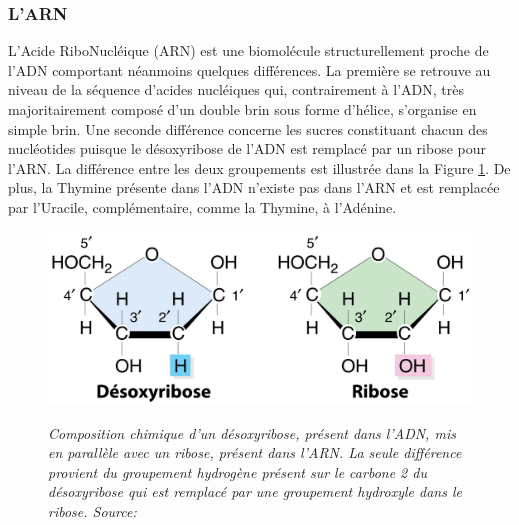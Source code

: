 \subsubsection{L'ARN}

L'Acide RiboNucléique (ARN) est une biomolécule structurellement proche de l'ADN comportant néanmoins quelques différences. La première se retrouve au niveau de la séquence d'acides nucléiques qui, contrairement à l'ADN, très majoritairement composé d'un double brin sous forme d'hélice, s'organise en simple brin. Une seconde différence concerne les sucres constituant chacun des nucléotides puisque le désoxyribose de l'ADN est remplacé par un ribose pour l'ARN. La différence entre les deux groupements est illustrée dans la Figure \ref{Fig:desoxyribose_vs_ribose}. De plus, la Thymine présente dans l'ADN n'existe pas dans l'ARN et est remplacée par l'Uracile, complémentaire, comme la Thymine, à l'Adénine.

\begin{figure}[htb]
  \centering
  {\includegraphics[width=0.8\linewidth]{./figures/ch1/desoxyribose_vs_ribose}}
    \caption[Comparaison composition chimique ADN/ARN]{\it Composition chimique d'un désoxyribose, présent dans l'ADN, mis en parallèle avec un ribose, présent dans l'ARN. La seule différence provient du groupement hydrogène présent sur le carbone 2 du désoxyribose qui est remplacé par une groupement hydroxyle dans le ribose. Source: \cite{russel2010igenetics}
    }
    \label{Fig:desoxyribose_vs_ribose}
  \hspace{0.2cm}
\end{figure}


